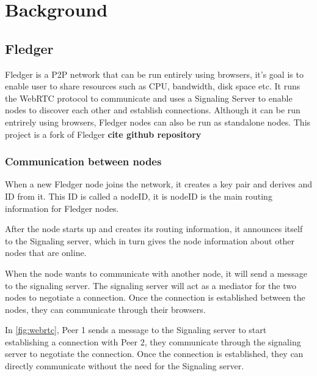 \documentclass[a4paper,11pt,oneside]{report}
\begin{document}
\chapter{Background}



\section{Fledger}
Fledger is a P2P network that can be run entirely using browsers, it's goal is to enable user to share resources such as CPU, bandwidth, disk space etc. It runs the WebRTC protocol to communicate and uses a Signaling Server to enable nodes to discover each other and establish connections. Although it can be run entrirely using browsers, Fledger nodes can also be run as standalone nodes. This project is a fork of Fledger \textbf{cite github repository}
\subsection{Communication between nodes}

When a new Fledger node joins the network, it creates a key pair and derives and ID from it. This ID is called a nodeID, it is nodeID is the main routing information for Fledger nodes. 

After the node starts up and creates its routing information, it announces itself to the Signaling server, which in turn gives the node information about other nodes that are online.

When the node wants to communicate with another node, it will send a message to the signaling server. The signaling server will act as a mediator for the two nodes to negotiate a connection. Once the connection is established between the nodes, they can communicate through their browsers.

In \autoref{fig:webrtc}, Peer 1 sends a message to the Signaling server to start establishing a connection with Peer 2, they communicate through the signaling server to negotiate the connection. Once the connection is established, they can directly communicate without the need for the Signaling server. 
\end{document}
